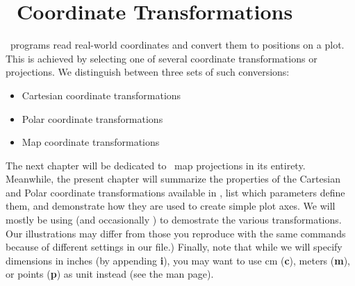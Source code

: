 %
%
\chapter{\gmt\ Coordinate Transformations}
\thispagestyle{headings}

\GMT\ programs read real-world coordinates and convert them to positions on a plot.
This is achieved by selecting one of several coordinate transformations or projections.
We distinguish between three sets of such conversions:

\begin{itemize}
\item Cartesian coordinate transformations
\item Polar coordinate transformations
\item Map coordinate transformations
\end{itemize}

The next chapter will be dedicated to \GMT\ map projections in its entirety.  Meanwhile, the present chapter
will summarize the properties of the Cartesian and Polar coordinate transformations available in \GMT, list
which parameters define them, and demonstrate how they are used to create simple plot axes.  We will mostly
be using  (and occasionally ) to demostrate the various transformations.
Our illustrations may differ from those you reproduce with the same commands because of different settings
in our  file.)  Finally, note that while we will specify dimensions in inches (by
appending {\bf i}), you may want to use cm ({\bf c}), meters ({\bf m}), or points ({\bf p}) as unit instead
(see the  man page). 



